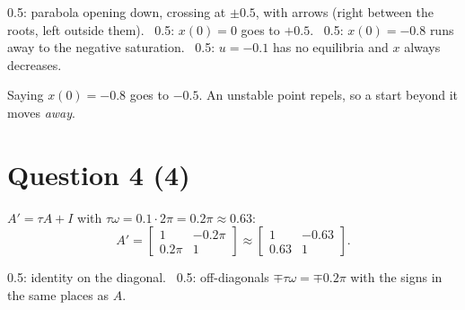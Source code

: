 \documentclass[11pt,letterpaper]{article}
\newcommand{\ans}[1]{\par\vspace{4pt}{\bfseries #1}\quad}
\begin{document}
\begin{marking}
0.5: parabola opening down, crossing at $\pm 0.5$, with arrows (right between the roots, left outside them). \ 0.5: $x(0) = 0$ goes to $+0.5$. \ 0.5: $x(0) = -0.8$ runs away to the negative saturation. \ 0.5: $u = -0.1$ has no equilibria and $x$ always decreases.
\end{marking}
\begin{trap}
Saying $x(0) = -0.8$ goes to $-0.5$. An unstable point repels, so a start beyond it moves \emph{away}.
\end{trap}

\section*{Question 4 \hfill (4)}

\ans{(a) [1]}
$A' = \tau A + I$ with $\tau\omega = 0.1 \cdot 2\pi = 0.2\pi \approx 0.63$:
\[
A' = \begin{bmatrix} 1 & -0.2\pi \\ 0.2\pi & 1\end{bmatrix} \approx \begin{bmatrix} 1 & -0.63 \\ 0.63 & 1\end{bmatrix}.
\]
\begin{marking}
0.5: identity on the diagonal. \ 0.5: off-diagonals $\mp\tau\omega = \mp 0.2\pi$ with the signs in the same places as $A$.
\end{marking}
\end{document}
